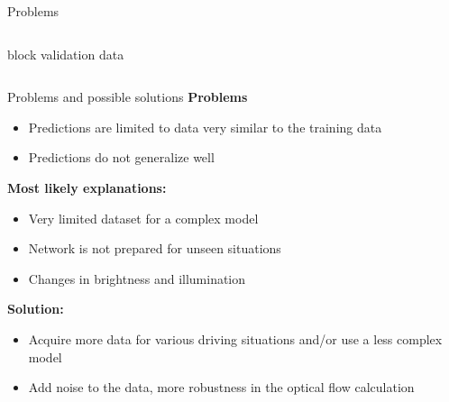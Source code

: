 \begin{frame}{Problems}
\begin{columns}[c]
\begin{column}{0.5\textwidth}
\begin{center}
		block validation data
		\end{center}
	\end{column}
\end{columns}
\end{frame}

\begin{frame}{Problems and possible solutions}
\textbf{Problems}
\begin{itemize}
	\item Predictions are limited to data very similar to the training data
	\item Predictions do not generalize well
\end{itemize}
\textbf{Most likely explanations:}
\begin{itemize}
	\item Very limited dataset for a complex model
	\item Network is not prepared for unseen situations
	\item Changes in brightness and illumination
\end{itemize}
\textbf{Solution:}
\begin{itemize}
	\item Acquire more data for various driving situations and/or use a less complex model
	\item Add noise to the data, more robustness in the optical flow calculation
\end{itemize}
\end{frame}

%
%

